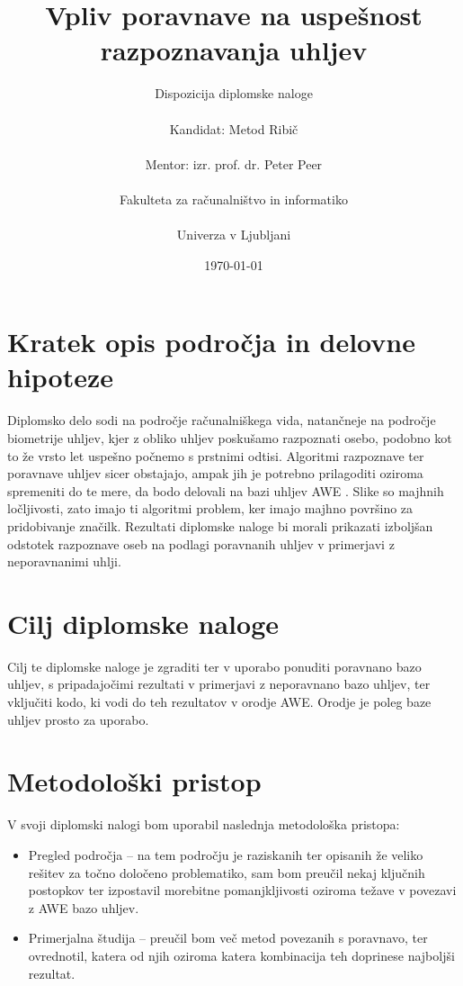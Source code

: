\documentclass[11pt,a4paper]{article}
\title{Vpliv poravnave na uspešnost razpoznavanja uhljev}
\author{Dispozicija diplomske naloge\\
\ \\
Kandidat: Metod Ribič \\
\ \\
Mentor: izr. prof. dr. Peter Peer\\
\ \\
Fakulteta za računalništvo in informatiko\\
\ \\
Univerza v Ljubljani}
\date{\today}
\begin{document}
\maketitle

\section{Kratek opis podro\v{c}ja in delovne hipoteze}

Diplomsko delo sodi na področje računalniškega vida, natančneje na področje biometrije uhljev, kjer z obliko uhljev poskušamo razpoznati osebo, podobno kot to že vrsto let uspešno počnemo s prstnimi odtisi. Algoritmi razpoznave ter poravnave uhljev sicer obstajajo, ampak jih je potrebno prilagoditi oziroma spremeniti do te mere, da bodo delovali na bazi uhljev AWE \cite{earsReview2016}. Slike so majhnih ločljivosti, zato imajo ti algoritmi problem, ker imajo majhno površino za pridobivanje značilk. Rezultati diplomske naloge bi morali prikazati izboljšan odstotek razpoznave oseb na podlagi poravnanih uhljev v primerjavi z neporavnanimi uhlji.


\section{Cilj diplomske naloge}

Cilj te diplomske naloge je zgraditi ter v uporabo ponuditi poravnano bazo uhljev, s pripadajočimi rezultati v primerjavi z neporavnano bazo uhljev, ter vključiti kodo, ki vodi do teh rezultatov v orodje AWE. Orodje je poleg baze uhljev prosto za uporabo.


\section{Metodolo\v ski pristop}

V svoji diplomski nalogi bom uporabil naslednja metodološka pristopa:
\begin{itemize}
	\item Pregled podro\v cja -- na tem področju je raziskanih ter opisanih že veliko rešitev za točno določeno 						problematiko, sam bom preučil nekaj ključnih postopkov ter izpostavil morebitne pomanjkljivosti oziroma težave v povezavi z AWE bazo uhljev.
	\item Primerjalna \v studija -- preučil bom več metod povezanih s poravnavo, ter ovrednotil, katera od njih oziroma katera kombinacija teh doprinese najboljši rezultat.

\end{itemize}
\end{document}
